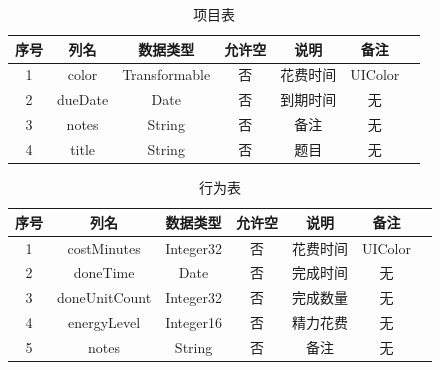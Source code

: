 \begin{table}[H]
	\centering
	\caption{项目表}
	\begin{tabular}{ccccccc} \toprule
	  序号 & 列名 & 数据类型 & 允许空 & 说明 & 备注 \\
	  \midrule
	  1 & color & Transformable & 否 & 花费时间 & UIColor \\
	  2 & dueDate & Date & 否 & 到期时间 & 无 \\
	  3 & notes & String & 否 & 备注 & 无 \\
	  4 & title & String & 否 & 题目 & 无 \\
	  \bottomrule
	\end{tabular}
\end{table}

\begin{table}[H]
	\centering
	\caption{行为表}
	\begin{tabular}{ccccccc} \toprule
	  序号 & 列名 & 数据类型 & 允许空 & 说明 & 备注 \\
	  \midrule
	  1 & costMinutes & Integer32 & 否 & 花费时间 & UIColor \\
	  2 & doneTime & Date & 否 & 完成时间 & 无 \\
	  3 & doneUnitCount & Integer32 & 否 & 完成数量 & 无 \\
	  4 & energyLevel & Integer16 & 否 & 精力花费 & 无 \\
	  5 & notes & String & 否 & 备注 & 无 \\
	  \bottomrule
	\end{tabular}
\end{table}

